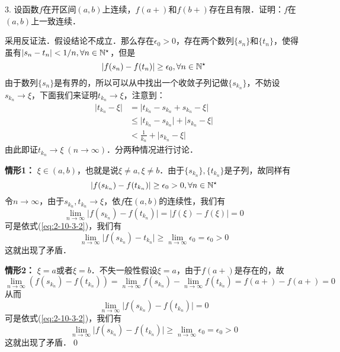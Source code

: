 3. 设函数$f$在开区间$(a,b)$上连续，$f(a+)$和$f(b+)$存在且有限．证明：$f$在$(a,b)$上一致连续．

\prove 采用反证法．假设结论不成立．那么存在$\epsilon_0 > 0$，存在两个数列$\{ s_n \}$和$\{ t_n \}$，使得虽有$ \lvert s_n - t_n \rvert < 1/n, \forall n \in \mathbb{N}^\star$，但是
\begin{equation}
    \lvert f(s_n) - f(t_n) \rvert \geq \epsilon_0, \forall n \in \mathbb{N}^\star
\end{equation}
由于数列$\{ s_n \}$是有界的，所以可以从中找出一个收敛子列记做$\{ s_{k_n} \}$，不妨设$ s_{k_n} \to \xi$，下面我们来证明$t_{k_n} \to \xi$，注意到：
\begin{align}
    \lvert t_{k_n} - \xi \rvert &= \lvert t_{k_n} - s_{k_n} + s_{k_n} - \xi \rvert \\
    &\leq \lvert t_{k_n} - s_{k_n} \rvert + \lvert s_{k_n} - \xi \rvert \\
    &< \frac{1}{k_n} + \lvert s_{k_n} - \xi \rvert \label{eq:2-10-3-1}
\end{align}
由此即证$t_{k_n} \to \xi \; (n \to \infty)$．分两种情况进行讨论．

\textbf{情形1：} $\xi \in (a, b)$，也就是说$\xi \neq a, \xi \neq b$．由于$\{ s_{k_n} \}, \{t_{k_n} \}$是子列，故同样有
\begin{equation}
    \lvert f(s_{k_n}) - f(t_{k_n}) \rvert \geq \epsilon_0 > 0, \forall n \in \mathbb{N}^\star
    \label{eq:2-10-3-2}
\end{equation}
令$n \to \infty$，由于$s_{k_n}, t_{k_n} \to \xi$，依$f$在$(a,b)$的连续性，我们有
\begin{equation}
    \lim_{n \to \infty} \lvert f(s_{k_n}) - f(t_{k_n}) \rvert = \lvert f(\xi) - f(\xi) \rvert = 0
\end{equation}
可是依式(\ref{eq:2-10-3-2})，我们有
\begin{equation}
    \lim_{n \to \infty} \lvert f(s_{k_n}) - t_{k_n} \rvert \geq \lim_{n \to \infty} \epsilon_0 = \epsilon_0 > 0
\end{equation}
这就出现了矛盾．

\textbf{情形2：} $\xi = a$或者$\xi = b$．不失一般性假设$\xi = a$，由于$f(a+)$是存在的，故
\begin{equation}
    \lim_{n \to \infty} \left( f(s_{k_n}) - f(t_{k_n}) \right) = \lim_{n \to \infty} f(s_{k_n}) - \lim_{n \to \infty} f(t_{k_n}) = f(a+) - f(a+) = 0
\end{equation}
从而
\begin{equation}
    \lim_{n \to \infty} \lvert f(s_{k_n}) - f(t_{k_n}) \rvert = 0
\end{equation}
可是依式(\ref{eq:2-10-3-2})，我们有
\begin{equation}
    \lim_{n \to \infty} \lvert f(s_{k_n}) - f(t_{k_n}) \rvert \geq \lim_{n \to \infty} \epsilon_0 = \epsilon_0 > 0
\end{equation}
这就出现了矛盾．\qed\bigskip


